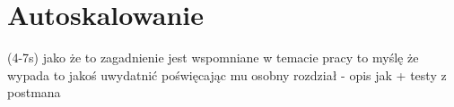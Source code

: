 \chapter{Autoskalowanie}
\label{cha:autoscaling}

(4-7s) jako że to zagadnienie jest wspomniane w temacie pracy 
to myślę że wypada to jakoś uwydatnić poświęcając mu osobny rozdział - opis jak + testy z postmana